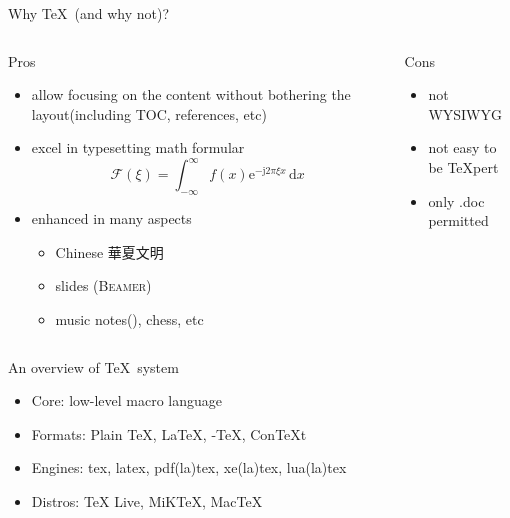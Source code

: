 \documentclass{beamer}
\def\TeXLive{\TeX{} Live\xspace}
\let\TL=\TeXLive
\begin{document}
\begin{frame}{Why \TeX\ (and why not)?}
  \begin{columns}[t]
    \begin{column}{.45\textwidth}
      \begin{block}{Pros}
        \begin{itemize}
          \item allow focusing on the content without bothering the
            layout(including TOC, references, etc)
          \item excel in typesetting math formular
            $$ \mathcal{F}(\xi)=\int_{-\infty}^{\infty}
            f(x)\mathrm{e}^{-\mathrm{j}2\pi \xi x}\,\mathrm{d}x $$
          \item enhanced in many aspects
            \begin{itemize}
              \item Chinese 華夏文明
              \item slides ({\scshape Beamer})
              \item music notes(\twonotes), chess, etc
            \end{itemize}
        \end{itemize}
      \end{block}
    \end{column}

    \begin{column}{.45\textwidth}
      \begin{block}{Cons}
        \begin{itemize}
          \item not WYSIWYG
          \item not easy to be \TeX{}pert
            \bigskip
          \item only .doc permitted
        \end{itemize}
      \end{block}
    \end{column}

  \end{columns}
\end{frame}

\begin{frame}{An overview of \TeX\ system}
  \begin{itemize}
    \item Core: low-level macro language
    \item Formats: Plain \TeX, \LaTeX, \AmS-\TeX, Con\TeX{}t
    \item Engines: tex, latex, pdf(la)tex, xe(la)tex, lua(la)tex
    \item Distros: \TL, MiK\TeX, Mac\TeX
  \end{itemize}
\end{frame}
\end{document}
